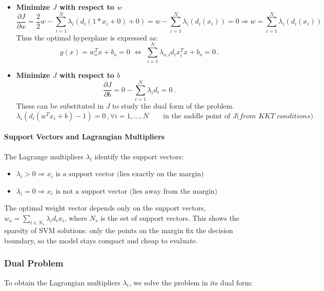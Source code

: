 \begin{itemize}
    \item [1.] \textbf{Minimize $J$ with respect to $w$}
    \begin{equation*}
    \dfrac{\partial J}{\partial w} = \dfrac{2}{2} w - \sum_{i=1}^N \lambda_i(d_i(1*x_i + 0) + 0) 
    = w - \sum_{i=1}^N \lambda_i(d_i(x_i)) = 0 \Rightarrow
    w = \sum_{i=1}^N \lambda_i(d_i(x_i))
\end{equation*}
Thus the optimal hyperplane is expressed as:
\begin{equation*}
    g(x) = w_o^T x + b_o = 0 \,\,
    \iff \,\,
    \sum_{i=1}^N \lambda_{o,i} d_i x_i^T x + b_o = 0 \, .
\end{equation*}

\item [2.] \textbf{Minimize $J$ with respect to $b$}
\begin{equation*}
    \dfrac{\partial J}{\partial b} = 0 - \sum_{i=1}^N \lambda_i d_i = 0 \, .
\end{equation*}
These can be substituted in $J$ to study the dual form of the problem.
\begin{equation*}
    \lambda_i (d_i (w^T x_i + b) - 1) = 0 \, , \forall i = 1, \dots , N \qquad\text{in the saddle point of $J$} \textit{(from KKT conditions)}
\end{equation*}

\end{itemize}

\paragraph{Support Vectors and Lagrangian Multipliers}
The Lagrange multipliers $\lambda_i$ identify the support vectors:
\begin{itemize}
    \item $\lambda_i > 0 \Rightarrow \text{$x_i$ is a support vector (lies exactly on the margin)}$
    \item $\lambda_i = 0 \Rightarrow \text{$x_i$ is not a support vector (lies away from the margin)}$
\end{itemize}

The optimal weight vector depends only on the support vectors, $w_o = \sum_{i \in N_s} \lambda_i d_i x_i$, where $N_s$ is the set of support vectors. This shows the sparsity of SVM solutions: only the points on the margin fix the decision boundary, so the model stays compact and cheap to evaluate.

\subsubsection{Dual Problem}
To obtain the Lagrangian multipliers $\lambda_i$, we solve the problem in its dual form:

